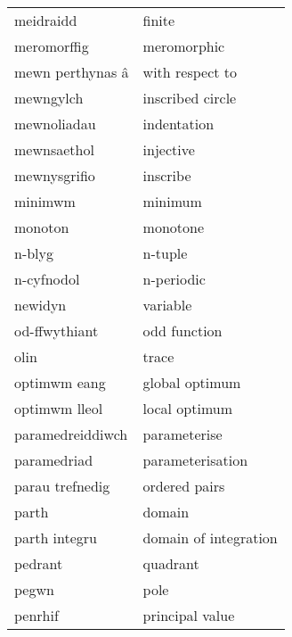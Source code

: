 \begin{supertabular}{p{0.22\textwidth}p{0.22\textwidth}}
                       meidraidd &                            finite \\
                     meromorffig &                       meromorphic \\
                mewn perthynas â &                   with respect to \\
                       mewngylch &                  inscribed circle \\
                     mewnoliadau &                       indentation \\
                     mewnsaethol &                         injective \\
                    mewnysgrifio &                          inscribe \\
                         minimwm &                           minimum \\
                         monoton &                          monotone \\
                          n-blyg &                           n-tuple \\
                      n-cyfnodol &                        n-periodic \\
                         newidyn &                          variable \\
                   od-ffwythiant &                      odd function \\
                            olin &                             trace \\
                    optimwm eang &                    global optimum \\
                   optimwm lleol &                     local optimum \\
                paramedreiddiwch &                      parameterise \\
                     paramedriad &                  parameterisation \\
                 parau trefnedig &                     ordered pairs \\
                           parth &                            domain \\
                   parth integru &             domain of integration \\
                         pedrant &                          quadrant \\
                           pegwn &                              pole \\
                         penrhif &                   principal value \\

\end{supertabular}
